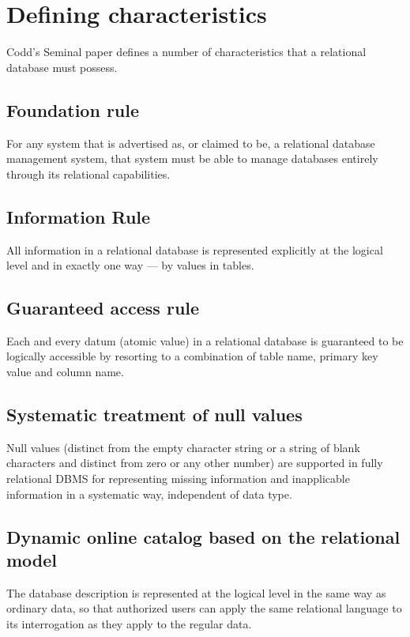 \section{Defining characteristics}

Codd's Seminal paper defines a number of characteristics that a relational database must possess.

\subsection{Foundation rule}
  For any system that is advertised as, or claimed to be, a relational database management system, that system must be able to manage databases entirely through its relational capabilities.
  
\subsection{Information Rule}
  All information in a relational database is represented explicitly at the logical level and in exactly one way --- by values in tables.

\subsection{Guaranteed access rule}
  Each and every datum (atomic value) in a relational database is guaranteed to be logically accessible by resorting to a combination of table name, primary key value and column name.

\subsection{Systematic treatment of null values}
  Null values (distinct from the empty character string or a string of blank characters and distinct from zero or any other number) are supported in fully relational DBMS for representing missing information and inapplicable information in a systematic way, independent of data type.

\subsection{Dynamic online catalog based on the relational model}
  The database description is represented at the logical level in the same way as ordinary data, so that authorized users can apply the same relational language to its interrogation as they apply to the regular data.

